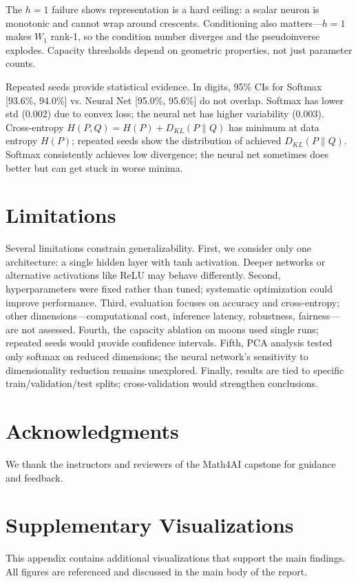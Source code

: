 \documentclass[sigconf,screen,nonacm,nofonts]{acmart}
\begin{document}
The \(h=1\) failure shows representation is a hard ceiling: a scalar neuron is monotonic and cannot wrap around crescents. Conditioning also matters—\(h=1\) makes \(W_1\) rank-1, so the condition number diverges and the pseudoinverse explodes. Capacity thresholds depend on geometric properties, not just parameter counts.

Repeated seeds provide statistical evidence. In digits, 95\% CIs for Softmax [93.6\%, 94.0\%] vs. Neural Net [95.0\%, 95.6\%] do not overlap. Softmax has lower std (0.002) due to convex loss; the neural net has higher variability (0.003). Cross-entropy \(H(P,Q) = H(P) + D_{KL}(P\|Q)\) has minimum at data entropy \(H(P)\); repeated seeds show the distribution of achieved \(D_{KL}(P\|Q)\). Softmax consistently achieves low divergence; the neural net sometimes does better but can get stuck in worse minima.

\section{Limitations}

Several limitations constrain generalizability. First, we consider only one architecture: a single hidden layer with tanh activation. Deeper networks or alternative activations like ReLU may behave differently. Second, hyperparameters were fixed rather than tuned; systematic optimization could improve performance. Third, evaluation focuses on accuracy and cross-entropy; other dimensions—computational cost, inference latency, robustness, fairness—are not assessed. Fourth, the capacity ablation on moons used single runs; repeated seeds would provide confidence intervals. Fifth, PCA analysis tested only softmax on reduced dimensions; the neural network's sensitivity to dimensionality reduction remains unexplored. Finally, results are tied to specific train/validation/test splits; cross-validation would strengthen conclusions.

\section*{Acknowledgments}
We thank the instructors and reviewers of the Math4AI capstone for guidance and feedback.




\appendix

\section{Supplementary Visualizations}
This appendix contains additional visualizations that support the main findings. All figures are referenced and discussed in the main body of the report.
\end{document}
